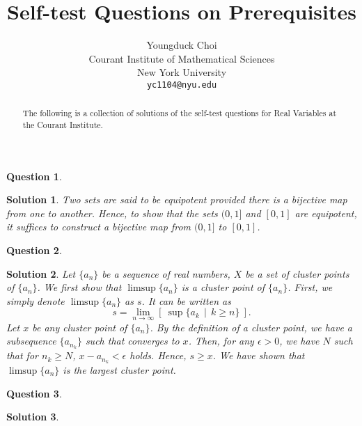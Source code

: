 \documentclass{article} %
\title{Self-test Questions on Prerequisites}
\author{
Youngduck Choi \\
Courant Institute of Mathematical Sciences \\
New York University \\
\texttt{yc1104@nyu.edu} \\
}
\theoremstyle{quest}
\newtheorem*{question}{Question}
\newtheorem*{solution}{Solution}
\begin{document}
\maketitle

\begin{abstract}
The following is a collection of solutions of the self-test questions for Real
Variables at the Courant Institute.
\end{abstract}

\begin{question}
\end{question}
\begin{solution}
Two sets are said to be equipotent provided there is a bijective map from one to another.
Hence, to show that the sets $(0,1]$ and $[0,1]$ are equipotent, it suffices to construct
a bijective map from $(0,1]$ to $[0,1]$.
\end{solution}

\begin{question}
\end{question}
\begin{solution}
Let $\{ a_n \}$ be a sequence of
real numbers, $X$ be a set of cluster points of $\{ a_n \}$. 
We first show that $\limsup \{ a_n \}$ is a cluster point of $\{ a_n \}$.
First, 
we simply denote $\limsup \{ a_n \}$ as $s$. It can be written as
\[
s = 
\underset{n \to \infty}{\lim} [ \> \sup \{ a_k \>\> | \>\> k \geq n \} \> ].
\]
Let $x$ be any cluster point of $\{ a_n \}$. By the definition of a cluster point,
we have a subsequence $\{ a_{n_k} \} $ such that converges to $x$. Then, for any $\epsilon > 0$,
we have $N$ such that for $n_k \geq N$, $x - a_{n_k} < \epsilon$ holds. Hence, $s \geq x$. We have
shown that $\limsup \{ a_n \}$ is the largest cluster point.
\end{solution}

\begin{question}
\end{question}
\begin{solution}
\end{solution}
\end{document}
